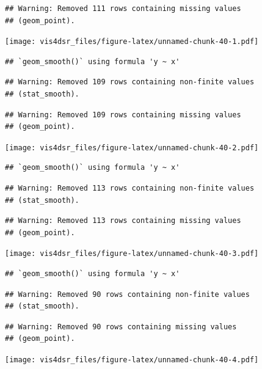 \documentclass[
]{krantz}
\begin{document}
\begin{verbatim}
## Warning: Removed 111 rows containing missing values
## (geom_point).
\end{verbatim}

\texttt{[image: vis4dsr\_files/figure-latex/unnamed-chunk-40-1.pdf]}

\begin{verbatim}
## `geom_smooth()` using formula 'y ~ x'
\end{verbatim}

\begin{verbatim}
## Warning: Removed 109 rows containing non-finite values
## (stat_smooth).
\end{verbatim}

\begin{verbatim}
## Warning: Removed 109 rows containing missing values
## (geom_point).
\end{verbatim}

\texttt{[image: vis4dsr\_files/figure-latex/unnamed-chunk-40-2.pdf]}

\begin{verbatim}
## `geom_smooth()` using formula 'y ~ x'
\end{verbatim}

\begin{verbatim}
## Warning: Removed 113 rows containing non-finite values
## (stat_smooth).
\end{verbatim}

\begin{verbatim}
## Warning: Removed 113 rows containing missing values
## (geom_point).
\end{verbatim}

\texttt{[image: vis4dsr\_files/figure-latex/unnamed-chunk-40-3.pdf]}

\begin{verbatim}
## `geom_smooth()` using formula 'y ~ x'
\end{verbatim}

\begin{verbatim}
## Warning: Removed 90 rows containing non-finite values
## (stat_smooth).
\end{verbatim}

\begin{verbatim}
## Warning: Removed 90 rows containing missing values
## (geom_point).
\end{verbatim}

\texttt{[image: vis4dsr\_files/figure-latex/unnamed-chunk-40-4.pdf]}
\end{document}
